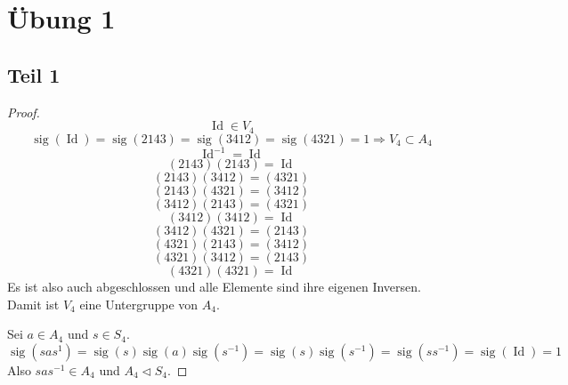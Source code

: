 \documentclass[10pt,a4paper]{article}
\DeclareMathOperator{\Id}{Id}
\DeclareMathOperator{\sig}{sig}
\begin{document}
\section{Übung 1}

\subsection{Teil 1}

\begin{proof}
  \begin{equation}
    \Id \in V_{4}
  \end{equation}
  \begin{equation}
    \sig(\Id) = \sig(2143) = \sig(3412) = \sig(4321) = 1 \Rightarrow V_{4} \subset A_{4}
  \end{equation}
  \begin{equation}
    \Id^{-1} = \Id
  \end{equation}
  \begin{equation}
    (2143)(2143) = \Id
  \end{equation}
  \begin{equation}
    (2143)(3412) = (4321)
  \end{equation}
  \begin{equation}
    (2143)(4321) = (3412)
  \end{equation}
  \begin{equation}
    (3412)(2143) = (4321)
  \end{equation}
  \begin{equation}
    (3412)(3412) = \Id
  \end{equation}
  \begin{equation}
    (3412)(4321) = (2143)
  \end{equation}
  \begin{equation}
    (4321)(2143) = (3412)
  \end{equation}
  \begin{equation}
    (4321)(3412) = (2143)
  \end{equation}
  \begin{equation}
    (4321)(4321) = \Id
  \end{equation}
  Es ist also auch abgeschlossen und alle Elemente sind ihre eigenen Inversen.
  Damit ist $V_{4}$ eine Untergruppe von $A_{4}$.

  Sei $a \in A_{4}$ und $s \in S_{4}$.
  \begin{equation}
    \sig(sas^{1}) = \sig(s)\sig(a)\sig(s^{-1}) = \sig(s)\sig(s^{-1}) = \sig(ss^{-1}) = \sig(\Id) = 1
  \end{equation}
  Also $sas^{-1} \in A_{4}$ und $A_{4} \triangleleft S_{4}$.
\end{proof}
\end{document}
